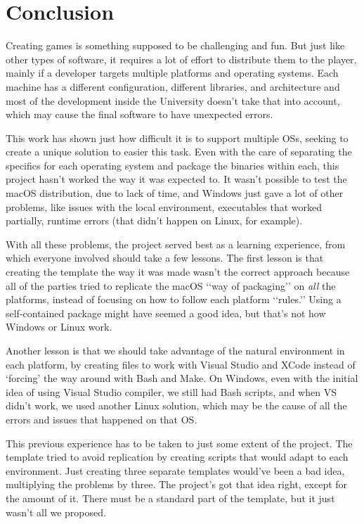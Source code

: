 \chapter{Conclusion}
\label{sec:conclusion}

Creating games is something supposed to be challenging and fun. But just like other types of software, it requires a lot of effort to distribute them to the player, mainly if a developer targets multiple platforms and operating systems. Each machine has a different configuration, different libraries, and architecture and most of the development inside the University doesn't take that into account, which may cause the final software to have unexpected errors.

This work has shown just how difficult it is to support multiple OSs, seeking to create a unique solution to easier this task. Even with the care of separating the specifics for each operating system and package the binaries within each, this project hasn't worked the way it was expected to. It wasn't possible to test the macOS distribution, due to lack of time, and Windows just gave a lot of other problems, like issues with the local environment, executables that worked partially, runtime errors (that didn't happen on Linux, for example).

With all these problems, the project served best as a learning experience, from which everyone involved should take a few lessons. The first lesson is that creating the template the way it was made wasn't the correct approach because all of the parties tried to replicate the macOS \lq\lq way of packaging\rq\rq{} on \textit{all} the platforms, instead of focusing on how to follow each platform \lq\lq rules.\rq\rq{} Using a self-contained package might have seemed a good idea, but that's not how Windows or Linux work.

Another lesson is that we should take advantage of the natural environment in each platform, by creating files to work with Visual Studio and XCode instead of \lq forcing\rq{} the way around with Bash and Make. On Windows, even with the initial idea of using Visual Studio compiler, we still had Bash scripts, and when VS didn't work, we used another Linux solution, which may be the cause of all the errors and issues that happened on that OS.

This previous experience has to be taken to just some extent of the project. The template tried to avoid replication by creating scripts that would adapt to each environment. Just creating three separate templates would've been a bad idea, multiplying the problems by three. The project's got that idea right, except for the amount of it. There must be a standard part of the template, but it just wasn't all we proposed.

